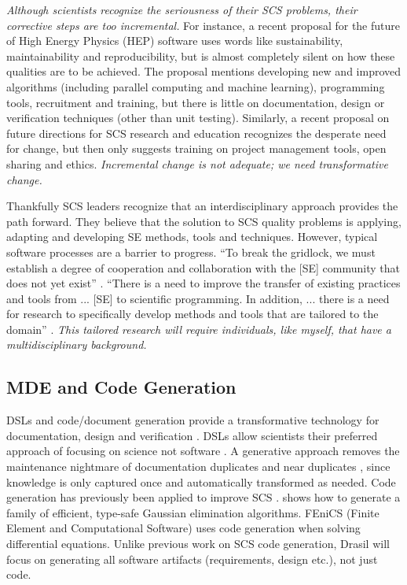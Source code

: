 \documentclass[12pt]{article}
\begin{document}
\emph{Although scientists recognize the seriousness of their SCS problems, their
  corrective steps are too incremental.}  For instance, a recent proposal for
the future of High Energy Physics (HEP) software \cite{StewartEtAl2017} uses
words like sustainability, maintainability and reproducibility, but is almost
completely silent on how these qualities are to be achieved.  The proposal
mentions developing new and improved algorithms (including parallel computing
and machine learning), programming tools, recruitment and training, but there is
little on documentation, design or verification techniques (other than unit
testing).  Similarly, a recent proposal on future directions for SCS research
and education \citep{RudeEtAl2018} recognizes the desperate need for change, but
then only suggests training on project management tools, open sharing and
ethics.  \emph{Incremental change is not adequate; we need transformative
  change.}

Thankfully SCS leaders recognize that an interdisciplinary approach provides the
path forward.  They believe that the solution to SCS quality problems is
applying, adapting and developing SE methods, tools and techniques.  However,
typical software processes are a barrier to progress.  ``To break the gridlock,
we must establish a degree of cooperation and collaboration with the [SE]
community that does not yet exist'' \citep{FaulkEtAl2009}.  ``There is a need to
improve the transfer of existing practices and tools from ... [SE] to scientific
programming. In addition, ... there is a need for research to specifically
develop methods and tools that are tailored to the domain'' \citep{Storer2017}.
\emph{This tailored research will require individuals, like myself, that have a
  multidisciplinary background.}

\subsection{MDE and Code Generation}

DSLs and code/document generation provide a transformative technology for
documentation, design and verification \citep{JohansonAndHasselbring2018,
  Smith2018}.  DSLs allow scientists their preferred approach of focusing on
science not software \citep{Kelly2007}.  A generative approach removes the
maintenance nightmare of documentation duplicates and near duplicates
\citep{LucivEtAl2018}, since knowledge is only captured once and automatically
transformed as needed.  Code generation has previously been applied to improve
SCS \citep{WhaleyEtAl2001, Veldhuizen1998, Pueschel2001}.
\citet{Carette2008} shows how to generate a family
of efficient, type-safe Gaussian elimination algorithms.  FEniCS (Finite Element
and Computational Software) \citep{LoggEtAl2012} uses code generation when
solving differential equations.  Unlike previous work on SCS code generation,
Drasil will focus on generating all software artifacts (requirements, design
etc.), not just code.
\end{document}

